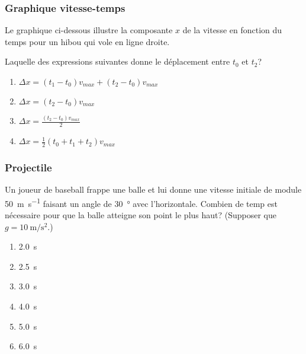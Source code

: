 \documentclass{beamer}
\begin{document}
\begin{frame}
  \frametitle{Graphique vitesse-temps}

  Le graphique ci-dessous illustre la composante $x$ de la vitesse en fonction
  du temps pour un hibou qui vole en ligne droite.

  \begin{center}
  \end{center}

  Laquelle des expressions suivantes donne le déplacement entre $t_0$ et $t_2$?

  \begin{enumerate}
    \item $\displaystyle{\Delta x = (t_1 - t_0)v_{max} + (t_2 - t_0)v_{max} }$
    \item $\displaystyle{\Delta x = (t_2 - t_0)v_{max} }$
    \item \alert<2>{$\displaystyle{\Delta x = \frac{(t_2 - t_0)v_{max}}{2} }$}
    \item $\displaystyle{\Delta x = \frac{1}{2} (t_0 + t_1 + t_2) v_{max} }$
  \end{enumerate}


\end{frame}


\begin{frame}
  \frametitle{Projectile}
  
  Un joueur de baseball frappe une balle et lui donne une vitesse initiale de
  module \SI{50}{\meter\per\second} faisant un angle de \SI{30}{\degree} avec
  l'horizontale.  Combien de temp est nécessaire pour que la balle atteigne
  son point le plus haut? (Supposer que $g = \SI{10}{\meter\per\second\squared}$.)

  \begin{enumerate}
    \item \SI{2.0}{s}
    \item \alert<2>{\SI{2.5}{s}}
    \item \SI{3.0}{s}
    \item \SI{4.0}{s}
    \item \SI{5.0}{s}
    \item \SI{6.0}{s}
  \end{enumerate}

\end{frame}
\end{document}
